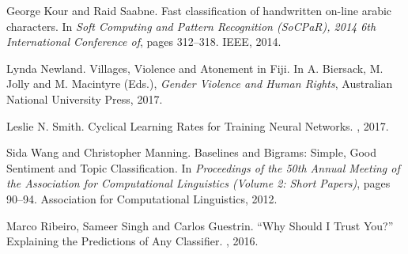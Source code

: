 \documentclass[twocolumn,10pt]{wmrDoc}
\begin{document}
\begin{thebibliography}{1}
George Kour and Raid Saabne.
\newblock Fast classification of handwritten on-line arabic characters.
\newblock In {\em Soft Computing and Pattern Recognition (SoCPaR), 2014 6th
  International Conference of}, pages 312--318. IEEE, 2014.

Lynda Newland.
\newblock Villages, Violence and Atonement in Fiji.
\newblock In A. Biersack, M. Jolly and M. Macintyre (Eds.), {\em Gender Violence and Human Rights}, Australian National University Press, 2017.

Leslie N. Smith.
\newblock Cyclical Learning Rates for Training Neural Networks.
, 2017.

Sida Wang and Christopher Manning.
\newblock Baselines and Bigrams: Simple, Good Sentiment and Topic Classification.
\newblock In {\em Proceedings of the 50th Annual Meeting of the Association for Computational Linguistics (Volume 2: Short Papers)}, pages 90--94. Association for Computational Linguistics, 2012.

Marco Ribeiro, Sameer Singh and Carlos Guestrin.
\newblock “Why Should I Trust You?” Explaining the Predictions of Any Classifier.
, 2016.


\end{thebibliography}
\end{document}
